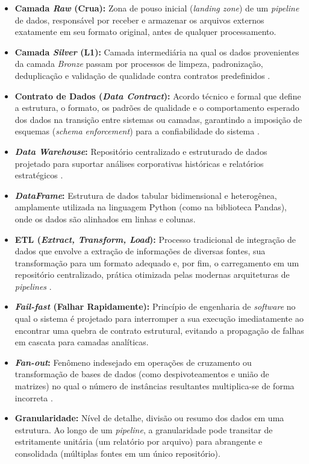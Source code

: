 \documentclass[
	12pt,				%
	openright,			%
	oneside,			%
	a4paper,			%
	english,			%
	brazil				%
	]{abntex2}
\begin{document}
\begin{apendicesenv}
\begin{itemize}
    \item \textbf{Camada \textit{Raw} (Crua):} Zona de pouso inicial (\textit{landing zone}) de um \textit{pipeline} de dados, responsável por receber e armazenar os arquivos externos exatamente em seu formato original, antes de qualquer processamento.
    \item \textbf{Camada \textit{Silver} (L1):} Camada intermediária na qual os dados provenientes da camada \textit{Bronze} passam por processos de limpeza, padronização, deduplicação e validação de qualidade contra contratos predefinidos \cite{gujjala_medallion}.
    \item \textbf{Contrato de Dados (\textit{Data Contract}):} Acordo técnico e formal que define a estrutura, o formato, os padrões de qualidade e o comportamento esperado dos dados na transição entre sistemas ou camadas, garantindo a imposição de esquemas (\textit{schema enforcement}) para a confiabilidade do sistema \cite{armbrust20}.
    \item \textbf{\textit{Data Warehouse}:} Repositório centralizado e estruturado de dados projetado para suportar análises corporativas históricas e relatórios estratégicos \cite{kimball13}.
    \item \textbf{\textit{DataFrame}:} Estrutura de dados tabular bidimensional e heterogênea, amplamente utilizada na linguagem Python (como na biblioteca Pandas), onde os dados são alinhados em linhas e colunas.
    \item \textbf{ETL (\textit{Extract, Transform, Load}):} Processo tradicional de integração de dados que envolve a extração de informações de diversas fontes, sua transformação para um formato adequado e, por fim, o carregamento em um repositório centralizado, prática otimizada pelas modernas arquiteturas de \textit{pipelines} \cite{gujjala_medallion}.
    \item \textbf{\textit{Fail-fast} (Falhar Rapidamente):} Princípio de engenharia de \textit{software} no qual o sistema é projetado para interromper a sua execução imediatamente ao encontrar uma quebra de contrato estrutural, evitando a propagação de falhas em cascata para camadas analíticas.
    \item \textbf{\textit{Fan-out}:} Fenômeno indesejado em operações de cruzamento ou transformação de bases de dados (como despivoteamentos e união de matrizes) no qual o número de instâncias resultantes multiplica-se de forma incorreta \cite{reis22}.
    \item \textbf{Granularidade:} Nível de detalhe, divisão ou resumo dos dados em uma estrutura. Ao longo de um \textit{pipeline}, a granularidade pode transitar de estritamente unitária (um relatório por arquivo) para abrangente e consolidada (múltiplas fontes em um único repositório).

\end{itemize}
\end{apendicesenv}
\end{document}
